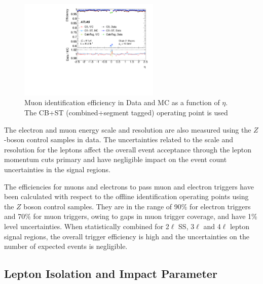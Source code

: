 \begin{figure}[htbp]
\begin{center}
\includegraphics[width=0.60\textwidth]{figs/systematics/fig_18a}
\caption{Muon identification efficiency in Data and MC as a function of $\eta$. The CB+ST (combined+segment tagged) operating point is used}
\label{figure:systematics_lepidsf}
\end{center}
\end{figure}

The electron\cite{EgammaReco} and muon\cite{MuonSF} energy scale and resolution are also measured using the $Z$-boson control samples in data. The uncertainties related to the scale and resolution for the leptons affect the overall event acceptance through the lepton momentum cuts primary and have negligible impact on the event count uncertainties in the signal regions.

The efficiencies for muons and electrons to pass muon\cite{ATLAS-CONF-2012-099} and electron triggers\cite{ATLAS-CONF-2012-048} have been calculated with respect to the offline identification operating points using the $Z$ boson control samples. They are in the range of 90\% for electron triggers and 70\% for muon triggers, owing to gaps in muon trigger coverage, and have 1\% level uncertainties. When statistically combined for 2$\ell$ SS, 3$\ell$ and 4$\ell$ lepton signal regions, the overall trigger efficiency is high and the uncertainties on the number of expected events is negligible. 


\subsection{Lepton Isolation and Impact Parameter}

